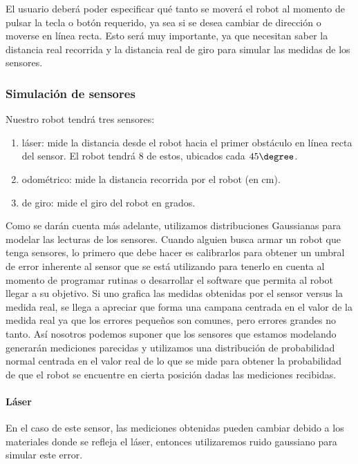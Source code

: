 El usuario deberá poder especificar qué tanto se moverá el robot al momento de pulsar la tecla o botón requerido, ya sea si se desea cambiar de dirección o moverse en línea recta. Esto será muy importante, ya que necesitan saber la distancia real recorrida y la distancia real de giro para simular las medidas de los sensores.

\subsubsection{Simulación de sensores}

\noindent Nuestro robot tendrá tres sensores:

\begin{enumerate}
  \item láser: mide la distancia desde el robot hacia el primer obstáculo en línea recta del sensor. El robot tendrá 8 de estos, ubicados cada \(45\degree\).
  \item odométrico: mide la distancia recorrida por el robot (en cm).
  \item de giro: mide el giro del robot en grados.
\end{enumerate}

Como se darán cuenta más adelante, utilizamos distribuciones Gaussianas para modelar las lecturas de los sensores. Cuando alguien busca armar un robot que tenga sensores, lo primero que debe hacer es calibrarlos para obtener un umbral de error inherente al sensor que se está utilizando para tenerlo en cuenta al momento de programar rutinas o desarrollar el software que permita al robot llegar a su objetivo. Si uno grafica las medidas obtenidas por el sensor versus la medida real, se llega a apreciar que forma una campana centrada en el valor de la medida real ya que los errores pequeños son comunes, pero errores grandes no tanto. Así nosotros podemos suponer que los sensores que estamos modelando generarán mediciones parecidas y utilizamos una distribución de probabilidad normal centrada en el valor real de lo que se mide para obtener la probabilidad de que el robot se encuentre en cierta posición dadas las mediciones recibidas.

\paragraph{Láser}\medskip
En el caso de este sensor, las mediciones obtenidas pueden cambiar debido a los materiales donde se refleja el láser, entonces utilizaremos ruido gaussiano para simular este error.

